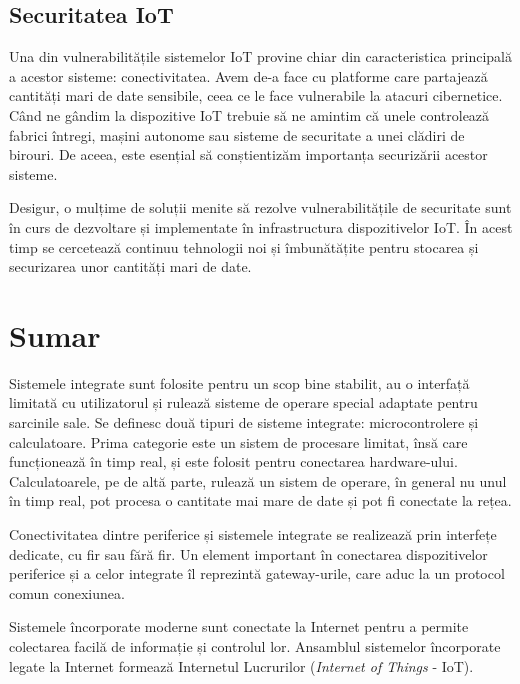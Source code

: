 \subsection{Securitatea IoT}
\label{sec:embed:iot:security}

Una din vulnerabilitățile sistemelor IoT provine chiar din caracteristica
principală a acestor sisteme: conectivitatea. Avem de-a face cu platforme care
partajează cantități mari de date sensibile, ceea ce le face vulnerabile la
atacuri cibernetice. Când ne gândim la dispozitive IoT trebuie să ne amintim
că unele controlează fabrici întregi, mașini autonome sau sisteme de
securitate a unei clădiri de birouri. De aceea, este esențial să conștientizăm
importanța securizării acestor sisteme.

Desigur, o mulțime de soluții menite să rezolve vulnerabilitățile de securitate
sunt în curs de dezvoltare și implementate în infrastructura dispozitivelor IoT.
În acest timp se cercetează continuu tehnologii noi și îmbunătățite pentru stocarea
și securizarea unor cantități mari de date.

\section{Sumar}
\label{sec:embed:summary}

Sistemele integrate sunt folosite pentru un scop bine stabilit, au o interfață
limitată cu utilizatorul și rulează sisteme de operare special adaptate pentru
sarcinile sale. Se definesc două tipuri de sisteme integrate: microcontrolere și
calculatoare. Prima categorie este un sistem de procesare limitat, însă care
funcționează în timp real, și este folosit pentru conectarea hardware-ului.
Calculatoarele, pe de altă parte, rulează un sistem de operare, în general nu unul
în timp real, pot procesa o cantitate mai mare de date și pot fi conectate la
rețea.

Conectivitatea dintre periferice și sistemele integrate se realizează prin interfețe dedicate, cu fir sau fără fir.
Un element important în conectarea dispozitivelor periferice și a celor integrate îl reprezintă gateway-urile, care aduc la un protocol comun conexiunea.

Sistemele încorporate moderne sunt conectate la Internet pentru a permite colectarea facilă de informație și controlul lor.
Ansamblul sistemelor încorporate legate la Internet formează Internetul Lucrurilor (\textit{Internet of Things} - IoT).
